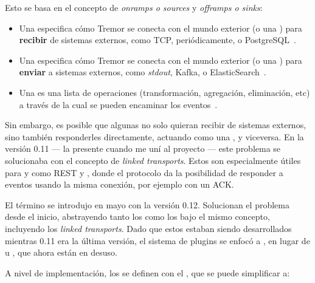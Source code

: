 Esto se basa en el concepto de \emph{onramps o sources} y \emph{offramps o
sinks}:

\begin{itemize}
    \item Una \onramp especifica cómo Tremor se conecta con el mundo exterior (o
        una \pipeline) para \textbf{recibir} de sistemas externos, como TCP,
        periódicamente, o PostgreSQL~\cite{tremoronramps}.

    \item Una \offramp especifica cómo Tremor se conecta con el mundo exterior
        (o una \pipeline) para \textbf{enviar} a sistemas externos, como
        \emph{stdout}, Kafka, o ElasticSearch~\cite{tremorofframps}.

    \item Una \pipeline es una lista de operaciones (transformación, agregación,
        eliminación, etc) a través de la cual se pueden encaminar los
        eventos~\cite{tremorpipelines}.

\end{itemize}


Sin embargo, es posible que algunas \onramps no solo quieran recibir de sistemas
externos, sino también responderles directamente, actuando como una \offramp, y
viceversa. En la versión 0.11 --- la presente cuando me uní al proyecto --- este
problema se solucionaba con el concepto de \emph{linked transports}. Estos son
especialmente útiles para \onramps y \offramps como REST y \websockets, donde el
protocolo da la posibilidad de responder a eventos usando la misma conexión, por
ejemplo con un ACK.

El término \connector se introdujo en mayo con la versión 0.12. Solucionan el
problema desde el inicio, abstrayendo tanto los \onramps como los \offramps bajo
el mismo concepto, incluyendo los \emph{linked transports}. Dado que estos
estaban siendo desarrollados mientras 0.11 era la última versión, el sistema de
plugins se enfocó a \connectors, en lugar de \onramps u \offramps, que ahora
están en desuso.

A nivel de implementación, los \connector se definen con el \trait
{}, que se puede simplificar a:

